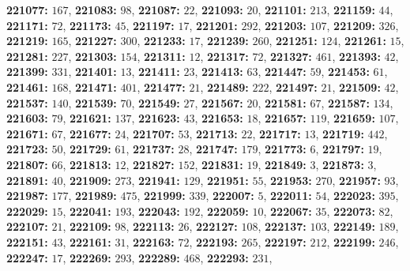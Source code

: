 \textsf{\bfseries 221077:} $167$, \textsf{\bfseries 221083:} $98$, \textsf{\bfseries 221087:} $22$, \textsf{\bfseries 221093:} $20$, \textsf{\bfseries 221101:} $213$, \textsf{\bfseries 221159:} $44$, \textsf{\bfseries 221171:} $72$, \textsf{\bfseries 221173:} $45$, \textsf{\bfseries 221197:} $17$, \textsf{\bfseries 221201:} $292$, \textsf{\bfseries 221203:} $107$, \textsf{\bfseries 221209:} $326$, \textsf{\bfseries 221219:} $165$, \textsf{\bfseries 221227:} $300$, \textsf{\bfseries 221233:} $17$, \textsf{\bfseries 221239:} $260$, \textsf{\bfseries 221251:} $124$, \textsf{\bfseries 221261:} $15$, \textsf{\bfseries 221281:} $227$, \textsf{\bfseries 221303:} $154$, \textsf{\bfseries 221311:} $12$, \textsf{\bfseries 221317:} $72$, \textsf{\bfseries 221327:} $461$, \textsf{\bfseries 221393:} $42$, \textsf{\bfseries 221399:} $331$, \textsf{\bfseries 221401:} $13$, \textsf{\bfseries 221411:} $23$, \textsf{\bfseries 221413:} $63$, \textsf{\bfseries 221447:} $59$, \textsf{\bfseries 221453:} $61$, \textsf{\bfseries 221461:} $168$, \textsf{\bfseries 221471:} $401$, \textsf{\bfseries 221477:} $21$, \textsf{\bfseries 221489:} $222$, \textsf{\bfseries 221497:} $21$, \textsf{\bfseries 221509:} $42$, \textsf{\bfseries 221537:} $140$, \textsf{\bfseries 221539:} $70$, \textsf{\bfseries 221549:} $27$, \textsf{\bfseries 221567:} $20$, \textsf{\bfseries 221581:} $67$, \textsf{\bfseries 221587:} $134$, \textsf{\bfseries 221603:} $79$, \textsf{\bfseries 221621:} $137$, \textsf{\bfseries 221623:} $43$, \textsf{\bfseries 221653:} $18$, \textsf{\bfseries 221657:} $119$, \textsf{\bfseries 221659:} $107$, \textsf{\bfseries 221671:} $67$, \textsf{\bfseries 221677:} $24$, \textsf{\bfseries 221707:} $53$, \textsf{\bfseries 221713:} $22$, \textsf{\bfseries 221717:} $13$, \textsf{\bfseries 221719:} $442$, \textsf{\bfseries 221723:} $50$, \textsf{\bfseries 221729:} $61$, \textsf{\bfseries 221737:} $28$, \textsf{\bfseries 221747:} $179$, \textsf{\bfseries 221773:} $6$, \textsf{\bfseries 221797:} $19$, \textsf{\bfseries 221807:} $66$, \textsf{\bfseries 221813:} $12$, \textsf{\bfseries 221827:} $152$, \textsf{\bfseries 221831:} $19$, \textsf{\bfseries 221849:} $3$, \textsf{\bfseries 221873:} $3$, \textsf{\bfseries 221891:} $40$, \textsf{\bfseries 221909:} $273$, \textsf{\bfseries 221941:} $129$, \textsf{\bfseries 221951:} $55$, \textsf{\bfseries 221953:} $270$, \textsf{\bfseries 221957:} $93$, \textsf{\bfseries 221987:} $177$, \textsf{\bfseries 221989:} $475$, \textsf{\bfseries 221999:} $339$, \textsf{\bfseries 222007:} $5$, \textsf{\bfseries 222011:} $54$, \textsf{\bfseries 222023:} $395$, \textsf{\bfseries 222029:} $15$, \textsf{\bfseries 222041:} $193$, \textsf{\bfseries 222043:} $192$, \textsf{\bfseries 222059:} $10$, \textsf{\bfseries 222067:} $35$, \textsf{\bfseries 222073:} $82$, \textsf{\bfseries 222107:} $21$, \textsf{\bfseries 222109:} $98$, \textsf{\bfseries 222113:} $26$, \textsf{\bfseries 222127:} $108$, \textsf{\bfseries 222137:} $103$, \textsf{\bfseries 222149:} $189$, \textsf{\bfseries 222151:} $43$, \textsf{\bfseries 222161:} $31$, \textsf{\bfseries 222163:} $72$, \textsf{\bfseries 222193:} $265$, \textsf{\bfseries 222197:} $212$, \textsf{\bfseries 222199:} $246$, \textsf{\bfseries 222247:} $17$, \textsf{\bfseries 222269:} $293$, \textsf{\bfseries 222289:} $468$, \textsf{\bfseries 222293:} $231$, 
